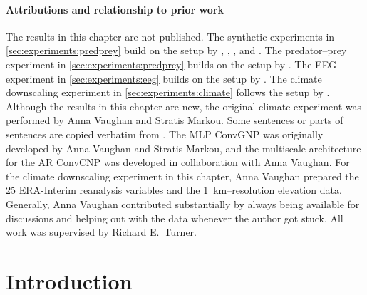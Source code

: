 \documentclass[12pt, twoside]{report}
\begin{document}
\paragraph{Attributions and relationship to prior work}
The results in this chapter are not published.
The synthetic experiments in \cref{sec:experiments:predprey} build on the setup by
,
,
, and
.
The predator--prey experiment in \cref{sec:experiments:predprey} builds on the setup by \textcite{Gordon:2020:Convolutional_Conditional_Neural_Processes,Markou:2022:Practical_Conditional_Neural_Processes_for_Tractable}.
The EEG experiment in \cref{sec:experiments:eeg} builds on the setup by \textcite{Gordon:2020:Convolutional_Conditional_Neural_Processes,Markou:2022:Practical_Conditional_Neural_Processes_for_Tractable}.
The climate downscaling experiment in \cref{sec:experiments:climate} follows the setup by \textcite{Markou:2022:Practical_Conditional_Neural_Processes_for_Tractable}.
Although the results in this chapter are new, the original climate experiment was performed by Anna Vaughan and Stratis Markou. 
Some sentences or parts of sentences are copied verbatim from \textcite{Markou:2022:Practical_Conditional_Neural_Processes_for_Tractable}.
The MLP ConvGNP was originally developed by Anna Vaughan and Stratis Markou,
and the multiscale architecture for the AR ConvCNP was developed in collaboration with Anna Vaughan.
For the climate downscaling experiment in this chapter, Anna Vaughan prepared the 25 ERA-Interim reanalysis variables and the \SI{1}{km}--resolution elevation data.
Generally, Anna Vaughan contributed substantially by always being available for discussions and helping out with the data whenever the author got stuck.
All work was supervised by Richard E.\ Turner.

\section{Introduction}
\label{sec:experiments:introduction}
\end{document}
